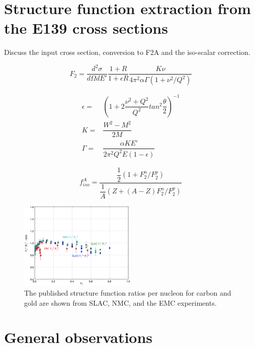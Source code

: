\documentclass[oneside]{article}
\begin{document}
\section{Structure function extraction from the E139 cross sections}

Discuss the input cross section, conversion to F2A and the iso-scalar correction.

\begin{equation}
F_2 = \dfrac{d^2\sigma}{d\Omega dE'}\dfrac{1+R}{1+\epsilon R}\dfrac{K\nu}{4\pi^2\alpha\Gamma (1+\nu^2/Q^2)}
\label{eq:matrixelements}
\end{equation}

\begin{align}
\epsilon=&(1+2\dfrac{\nu^2+Q^2}{Q^2}tan^2\dfrac{\theta}{2})^{-1}\\
K=&\dfrac{W^2-M^2}{2M}\\
\Gamma=&\dfrac{\alpha KE'}{2\pi^2Q^2E(1-\epsilon)}
\label{eq:matrixeqn}
\end{align}

\begin{equation}
f_{iso}^A = \dfrac{\dfrac{1}{2}(1+F_2^n/F_2^p)}{\dfrac{1}{A}(Z+(A-Z)F_2^n/F_2^p)}
\label{eq:matrixelements}
\end{equation}

\begin{figure}[H]
  \centering
      	  \includegraphics[width=0.5\textwidth]{plots/emc_ratios_data.png}
 	 \caption[EMC ratios for various data]{The published structure function ratios per nucleon for carbon and gold are shown from SLAC, NMC, and the EMC experiments.}
  \label{fig:emc_ratios}
 \end{figure}

\section{General observations}
 
\end{document}
